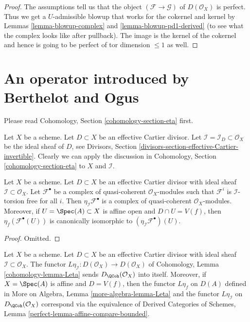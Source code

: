 \begin{proof}
The assumptions tell us that the object $(\mathcal{F} \to \mathcal{G})$
of $D(\mathcal{O}_X)$ is perfect. Thus we get a $U$-admissible blowup that
works for the cokernel and kernel by Lemmas \ref{lemma-blowup-complex}
and \ref{lemma-blowup-pd1-derived} (to see what the complex looks
like after pullback). The image is the kernel of the cokernel
and hence is going to be perfect of tor dimension $\leq 1$ as well.
\end{proof}











\section{An operator introduced by Berthelot and Ogus}
\label{section-eta}

\noindent
Please read Cohomology, Section \ref{cohomology-section-eta} first.

\medskip\noindent
Let $X$ be a scheme. Let $D \subset X$ be an effective
Cartier divisor. Let $\mathcal{I} = \mathcal{I}_D \subset \mathcal{O}_X$
be the ideal sheaf of $D$, see
Divisors, Section
\ref{divisors-section-effective-Cartier-invertible}.
Clearly we can apply the discussion in 
Cohomology, Section \ref{cohomology-section-eta} to $X$ and $\mathcal{I}$.

\begin{lemma}
\label{lemma-eta-stalks}
Let $X$ be a scheme. Let $D \subset X$ be an effective
Cartier divisor with ideal sheaf $\mathcal{I} \subset \mathcal{O}_X$.
Let $\mathcal{F}^\bullet$ be a complex of quasi-coherent
$\mathcal{O}_X$-modules such that $\mathcal{F}^i$ is
$\mathcal{I}$-torsion free for all $i$. Then
$\eta_\mathcal{I}\mathcal{F}^\bullet$ is a complex of
quasi-coherent $\mathcal{O}_X$-modules. Moreover,
if $U = \Spec(A) \subset X$ is affine open and $D \cap U = V(f)$,
then $\eta_f(\mathcal{F}^\bullet(U))$ is canonically isomorphic
to $(\eta_\mathcal{I}\mathcal{F}^\bullet)(U)$.
\end{lemma}

\begin{proof}
Omitted.
\end{proof}

\begin{lemma}
\label{lemma-Leta}
Let $X$ be a scheme. Let $D \subset X$ be an effective
Cartier divisor with ideal sheaf $\mathcal{I} \subset \mathcal{O}_X$.
The functor $L\eta_\mathcal{I} : D(\mathcal{O}_X) \to D(\mathcal{O}_X)$ of
Cohomology, Lemma \ref{cohomology-lemma-Leta} sends
$D_\QCoh(\mathcal{O}_X)$ into itself.
Moreover, if $X = \Spec(A)$ is affine and $D = V(f)$,
then the functor $L\eta_f$ on $D(A)$ defined in
More on Algebra, Lemma \ref{more-algebra-lemma-Leta}
and the functor $L\eta_\mathcal{I}$ on $D_\QCoh(\mathcal{O}_X)$
correspond via the equivalence of Derived Categories of Schemes, Lemma
\ref{perfect-lemma-affine-compare-bounded}.
\end{lemma}

